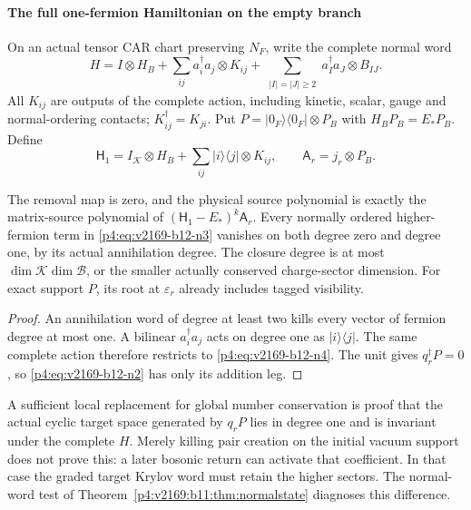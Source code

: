 \documentclass[12pt,a4paper]{article}
\begin{document}
\paragraph{The full one-fermion Hamiltonian on the empty branch}
On an actual tensor CAR chart preserving $N_F$, write the complete normal word
\begin{equation}
 H=I\otimes H_B+\sum_{ij}a_i^\dagger a_j\otimes K_{ij}
       +\sum_{\substack{|I|=|J|\ge2}}a_I^\dagger a_J\otimes B_{IJ}.
 \label{p4:eq:v2169-b12-n3}
\end{equation}
All $K_{ij}$ are outputs of the complete action, including kinetic, scalar,
gauge and normal-ordering contacts; $K_{ij}^\dagger=K_{ji}$.
Put $P=|0_F\rangle\langle0_F|\otimes P_B$ with
$H_BP_B=E_*P_B$. Define
\begin{equation}
 \boxed{\mathsf H_1=I_{\mathcal K}\otimes H_B+
                 \sum_{ij}|i\rangle\langle j|\otimes K_{ij},\qquad
 \mathsf A_r=j_r\otimes P_B.} \label{p4:eq:v2169-b12-n4}
\end{equation}

\begin{corollary}
\label{p4:v2169:b12:cor:onefermion}
The removal map is zero, and the physical source polynomial is exactly the
matrix-source polynomial of
$(\mathsf H_1-E_*)^k\mathsf A_r$. Every normally ordered higher-fermion term in
\eqref{p4:eq:v2169-b12-n3} vanishes on both degree zero and degree one, by its actual annihilation
degree. The closure degree is at most $\dim\mathcal K\dim\mathcal B$, or the
smaller actually conserved charge-sector dimension. For exact support $P$,
its root at $\varepsilon_r$ already includes tagged visibility.
\end{corollary}
\begin{proof}
An annihilation word of degree at least two kills every vector of fermion
degree at most one. A bilinear $a_i^\dagger a_j$ acts on degree one as
$|i\rangle\langle j|$. The same complete action therefore restricts to \eqref{p4:eq:v2169-b12-n4}.
The unit gives $q_r^\dagger P=0$, so \eqref{p4:eq:v2169-b12-n2} has only its addition leg.
\end{proof}

A sufficient local replacement for global number conservation is proof that
the actual cyclic target space generated by $q_rP$ lies in degree one and
is invariant under the complete $H$. Merely killing pair creation on the
initial vacuum support does not prove this: a later bosonic return can activate
that coefficient. In that case the graded target Krylov word must retain the
higher sectors. The normal-word test of Theorem~\ref{p4:v2169:b11:thm:normalstate} diagnoses this difference.
\end{document}
